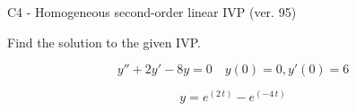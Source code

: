 \begin{exercise}
  \begin{exerciseTitle}C4 - Homogeneous second-order linear IVP (ver. 95)\end{exerciseTitle}
  \begin{exerciseStatement}
    
Find the solution to the given IVP.

    
\[y''+2y'-8y = 0 \hspace{1em} y(0) = 0 , y'(0) = 6\]

  \end{exerciseStatement}
  \begin{exerciseAnswer}
    
\[y= e^{\left(2 \, t\right)} - e^{\left(-4 \, t\right)}\]

  \end{exerciseAnswer}
\end{exercise}
